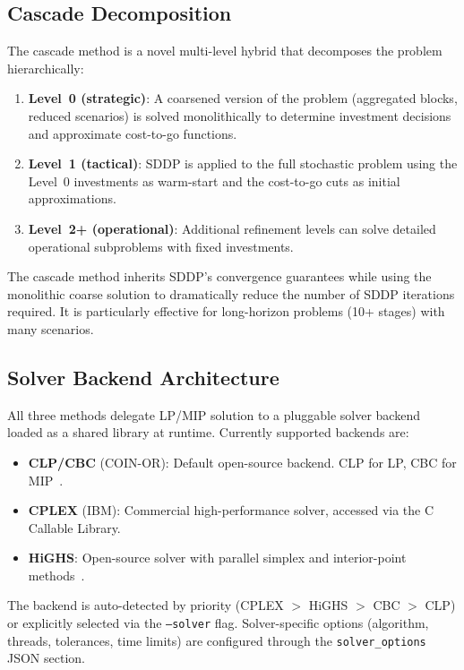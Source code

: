 \subsection{Cascade Decomposition}
\label{sec:cascade}

The cascade method is a novel multi-level hybrid that decomposes the
problem hierarchically:

\begin{enumerate}
  \item \textbf{Level~0 (strategic)}: A coarsened version of the problem
    (aggregated blocks, reduced scenarios) is solved monolithically to
    determine investment decisions and approximate cost-to-go functions.
  \item \textbf{Level~1 (tactical)}: SDDP is applied to the full
    stochastic problem using the Level~0 investments as warm-start and
    the cost-to-go cuts as initial approximations.
  \item \textbf{Level~2+ (operational)}: Additional refinement levels
    can solve detailed operational subproblems with fixed investments.
\end{enumerate}

The cascade method inherits SDDP's convergence guarantees while using the
monolithic coarse solution to dramatically reduce the number of SDDP
iterations required.  It is particularly effective for long-horizon problems
(10+ stages) with many scenarios.

\subsection{Solver Backend Architecture}

All three methods delegate LP/MIP solution to a pluggable solver backend
loaded as a shared library at runtime.  Currently supported backends are:

\begin{itemize}
  \item \textbf{CLP/CBC} (COIN-OR): Default open-source backend.  CLP for
    LP, CBC for MIP~\cite{forrest2005cbc}.
  \item \textbf{CPLEX} (IBM): Commercial high-performance solver, accessed
    via the C Callable Library.
  \item \textbf{HiGHS}: Open-source solver with parallel simplex and
    interior-point methods~\cite{huangfu2018highs}.
\end{itemize}

The backend is auto-detected by priority (CPLEX $>$ HiGHS $>$ CBC $>$ CLP)
or explicitly selected via the \texttt{--solver} flag.  Solver-specific
options (algorithm, threads, tolerances, time limits) are configured
through the \texttt{solver\_options} JSON section.
